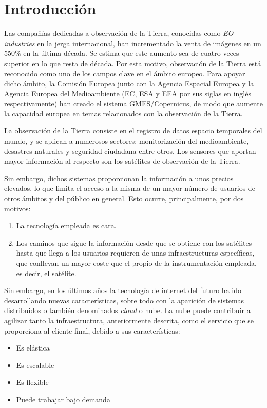 \section{Introducción}
\label{sec:intro}

Las compañías dedicadas a observación de la Tierra, conocidas como \emph{EO industries} en la jerga internacional, han incrementado la venta de imágenes en un 550\% en la última década. Se estima que este aumento sea de cuatro veces superior en lo que resta de década. Por esta motivo, observación de la Tierra está reconocido como uno de los campos clave en el ámbito europeo. Para apoyar dicho ámbito, la Comisión Europea junto con la Agencia Espacial Europea y la Agencia Europea del Medioambiente (EC, ESA y EEA por sus siglas en inglés respectivamente) han creado el sistema GMES/Copernicus, de modo que aumente la capacidad europea en temas relacionados con la observación de la Tierra.

La observación de la Tierra consiste en el registro de datos espacio temporales del mundo, y se aplican a numerosos sectores: monitorización del medioambiente, desastres naturales y seguridad ciudadana entre otros. Los sensores que aportan mayor información al respecto son los satélites de observación de la Tierra.

Sin embargo, dichos sistemas proporcionan la información a unos precios elevados, lo que limita el acceso a la misma de un mayor número de usuarios de otros ámbitos y del público en general. Esto ocurre, principalmente, por dos motivos:
\begin{enumerate}
\item La tecnología empleada es cara.
\item Los caminos que sigue la información desde que se obtiene con los satélites hasta que llega a los usuarios requieren de unas infraestructuras específicas, que conllevan un mayor coste que el propio de la instrumentación empleada, es decir, el satélite.
\end{enumerate}

Sin embargo, en los últimos años la tecnología de internet del futuro ha ido desarrollando nuevas características, sobre todo con la aparición de sistemas distribuidos o también denominados \emph{cloud} o nube. La nube puede contribuir a agilizar tanto la infraestructura, anteriormente descrita, como el servicio que se proporciona al cliente final, debido a sus características:
\begin{itemize}
\item Es elástica
\item Es escalable
\item Es flexible
\item Puede trabajar bajo demanda
\end{itemize}

